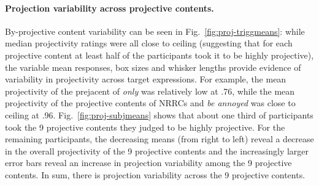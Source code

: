 \documentclass[11pt,fleqn]{article}
\newcommand{\6}{\mbox{$[\hspace*{-.6mm}[$}}
\newcommand{\9}{\mbox{$]\hspace*{-.6mm}]$}}
\newcommand{\figref}[1]{Fig.~\ref{#1}}
\begin{document}
\paragraph{Projection variability across projective contents.} By-projective content variability can be seen in \figref{fig:proj-triggmeans}:  while median projectivity ratings were all close to ceiling (suggesting that for each projective content at least half of the participants took it to be highly projective), the variable mean responses, box sizes and whisker lengths provide evidence of variability in projectivity across target expressions. For example, the mean projectivity of the prejacent of \emph{only} was relatively low at .76, while the mean projectivity of the projective contents of NRRCs and \emph{be annoyed} was close to ceiling at .96. \figref{fig:proj-subjmeans} shows that about one third of participants took the 9 projective contents they judged to be highly projective. For the remaining participants, the decreasing means (from right to left) reveal a decrease in the overall projectivity of the 9 projective contents and the increasingly larger error bars reveal an increase in projection variability among the 9 projective contents. In sum, there is projection variability across the 9 projective contents.
\end{document}
